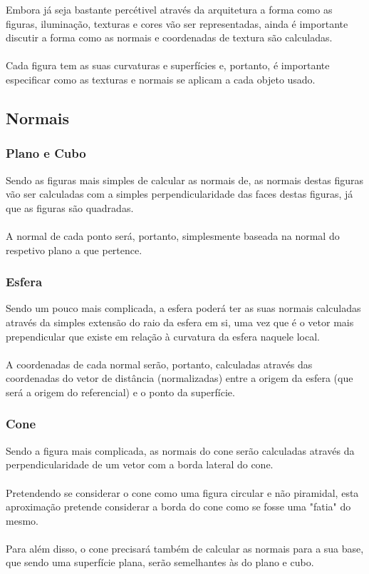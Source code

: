 Embora já seja bastante percétivel através da arquitetura a
forma como as figuras, iluminação, texturas e cores vão ser
representadas, ainda é importante discutir a forma como as
normais e coordenadas de textura são calculadas.\\
\\
Cada figura tem as suas curvaturas e superfícies e, portanto,
é importante especificar como as texturas e normais se aplicam
a cada objeto usado.

\subsection{Normais}

\subsubsection{Plano e Cubo}

Sendo as figuras mais simples de calcular as normais de,
as normais destas figuras vão ser calculadas com a simples
perpendicularidade das faces destas figuras, já que as figuras
são quadradas.\\
\\
A normal de cada ponto será, portanto, simplesmente baseada
na normal do respetivo plano a que pertence.

\subsubsection{Esfera}

Sendo um pouco mais complicada, a esfera poderá ter as suas
normais calculadas através da simples extensão do raio da
esfera em si, uma vez que é o vetor mais prependicular que
existe em relação à curvatura da esfera naquele local.\\
\\
A coordenadas de cada normal serão, portanto, calculadas
através das coordenadas do vetor de distância (normalizadas)
entre a origem da esfera (que será a origem do
referencial) e o ponto da superfície.

\subsubsection{Cone}

Sendo a figura mais complicada, as normais do cone serão
calculadas através da perpendicularidade de um vetor com
a borda lateral do cone.\\
\\
Pretendendo se considerar o cone como uma figura circular e não
piramidal, esta aproximação pretende considerar a borda do cone
como se fosse uma "fatia" do mesmo.\\
\\
Para além disso, o cone precisará também de calcular as normais
para a sua base, que sendo uma superfície plana, serão semelhantes
às do plano e cubo.


